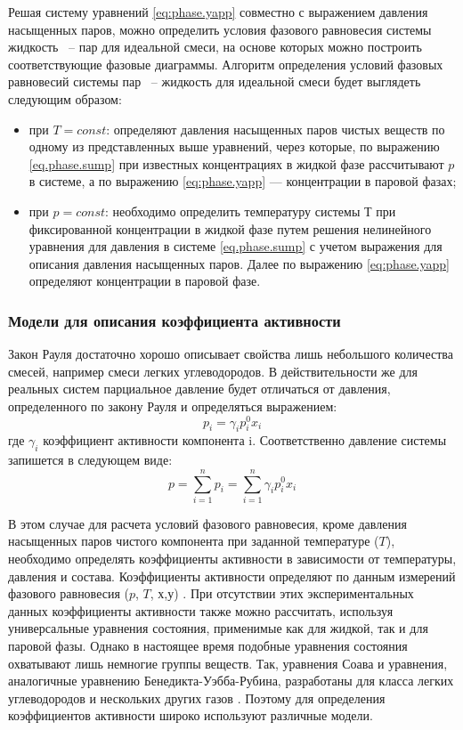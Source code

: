 Решая систему уравнений \eqref{eq:phase.yapp} совместно с выражением давления насыщенных паров, можно определить условия фазового равновесия системы жидкость ~-- пар для идеальной смеси, на основе которых можно построить соответствующие фазовые диаграммы. 
Алгоритм определения условий фазовых равновесий системы пар ~-- жидкость для идеальной смеси будет выглядеть следующим образом:
\begin{itemize}
	\item при $T = const$: определяют давления насыщенных паров чистых веществ по одному из представленных выше уравнений, через которые, по выражению \eqref{eq.phase.sump} при известных концентрациях в жидкой фазе рассчитывают  $p$ в системе, а по выражению  \eqref{eq:phase.yapp} --- концентрации в паровой фазах;
	\item при $p = const$: необходимо определить температуру системы $Т$ при фиксированной концентрации в жидкой фазе путем решения нелинейного уравнения для давления в системе \eqref{eq.phase.sump} с учетом выражения для описания давления насыщенных паров. Далее по выражению \eqref{eq:phase.yapp} определяют концентрации в паровой фазе.
\end{itemize}

\subsubsection*{Модели для описания коэффициента активности}
Закон Рауля достаточно хорошо описывает свойства лишь небольшого количества смесей, например смеси легких углеводородов. В действительности же для реальных систем парциальное давление будет отличаться от давления, определенного по закону Рауля и определяться выражением:
\begin{equation}
p_i=\gamma_i p_i^0 x_i
\end{equation}
где  $\gamma_i$ коэффициент активности компонента i. Соответственно давление системы запишется в следующем виде:
\begin{equation} \label{eq.phase.pressgam}
p=\sum\limits_{i=1}^{n} p_i=\sum\limits_{i=1}^{n} \gamma_i p_i^0 x_i
\end{equation}

В этом случае для расчета условий фазового равновесия, кроме давления насыщенных паров чистого компонента при заданной температуре ($T$), необходимо определять коэффициенты активности в зависимости от температуры, давления и состава.
Коэффициенты активности определяют по данным измерений фазового равновесия ($p$, $T$, $х$,$ у$) \cite{kogan1,kogan2} . При отсутствии этих экспериментальных данных коэффициенты активности также можно рассчитать, используя универсальные уравнения состояния, применимые как для жидкой, так и для паровой фазы. Однако в настоящее время подобные уравнения состояния охватывают лишь немногие группы веществ. Так, уравнения Соава и уравнения, аналогичные уравнению Бенедикта-Уэбба-Рубина, разработаны для класса легких углеводородов и нескольких других газов \cite{rid1982}. Поэтому для определения коэффициентов активности широко используют различные модели.

